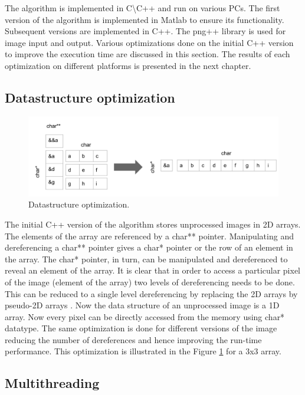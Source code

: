 The algorithm is implemented in C\textbackslash C++ and run on various PCs. The first version of the algorithm is implemented in Matlab to ensure its functionality. Subsequent versions are implemented in C++. The png++ library is used for image input and output. Various optimizations done on the initial C++ version to improve the execution time are discussed in this section. The results of each optimization on different platforms is presented in the next chapter.

\subsection{Datastructure optimization}
\label{s:optimizations:dsoptimization}

\begin{figure}[!htbp]
    \center
    \includegraphics[width=.8\linewidth]{figures/dsoptimization}
    \caption{Datastructure optimization.}
    \label{fig:dsoptimization}
\end{figure}

The initial C++ version of the algorithm stores unprocessed images in 2D arrays. The elements of the array are referenced by a char** pointer. Manipulating and dereferencing a char** pointer gives a char* pointer or the row of an element in the array. The char* pointer, in turn, can be manipulated and dereferenced to reveal an element of the array. It is clear that in order to access a particular pixel of the image (element of the array) two levels of dereferencing needs to be done. This can be reduced to a single level dereferencing by replacing the 2D arrays by pseudo-2D arrays \cite{Souli2007}. Now the data structure of an unprocessed image is a 1D array. Now every pixel can be directly accessed from the memory using char* datatype. The same optimization is done for different versions of the image reducing the number of dereferences and hence improving the run-time performance. This optimization is illustrated in the Figure \ref{fig:dsoptimization} for a 3x3 array.

\subsection{Multithreading}
\label{s:optimizations:multithreading}

